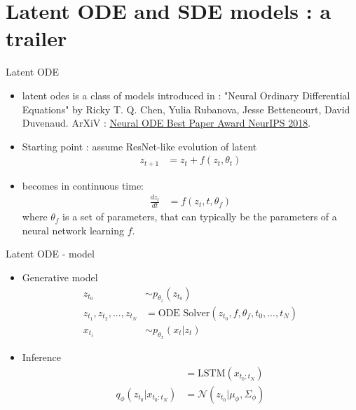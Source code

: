 \section{Latent ODE and SDE models : a trailer}\label{Latent ODE and SDE}

\begin{frame}{Latent ODE}
    \begin{itemize}
        \item \glspl{latent ode} is a class of models introduced in \cite{chen_neural_2019} : "Neural Ordinary Differential Equations" 
by Ricky T. Q. Chen, Yulia Rubanova, Jesse Bettencourt, David Duvenaud. 
ArXiV : \href{https://arxiv.org/abs/1806.07366}{Neural ODE Best Paper Award NeurIPS 2018}.
        \item Starting point : assume ResNet-like evolution of latent
            \begin{align}
                z_{t+1} &= z_t + f(z_t, \theta_t)
            \end{align}
        \item becomes in continuous time:
        \begin{align}
                \frac{dz_t}{dt} &= f(z_t, t, \theta_f)
        \end{align}
            where $\theta_f$ is a set of parameters, that can typically be the parameters of 
            a neural network learning $f$.
    \end{itemize}
\end{frame}

\begin{frame}{Latent ODE - model}
    \begin{itemize}
        \item Generative model
            \begin{align}
                z_{t_0} &\sim p_{\theta_z}(z_{t_0}) \\
                z_{t_1}, z_{t_2}, ..., z_{t_N} &= \text{ODE Solver}(z_{t_0}, f, \theta_f, t_0, ..., t_N ) \\
                x_{t_i} &\sim p_{\theta_x}(x_t \vert z_t)
            \end{align}
        \item Inference
        \begin{align}
                [\mu_\phi, \Sigma_\phi] &= \text{LSTM} (x_{t_0:t_N})   \\
                q_{\phi}(z_{t_0} \vert x_{t_0:t_N}) &= \mathcal{N}(z_{t_0} \vert \mu_{\phi}, \Sigma_\phi)
        \end{align}
    \end{itemize}
\end{frame}

